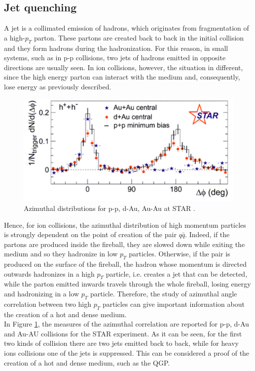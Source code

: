 \subsection{Jet quenching}
A jet is a collimated emission of hadrons, which originates from fragmentation of a high-$p_{T}$ parton. These partons are created back to back in the initial collision and they form hadrons during the hadronization. For this reason, in small systems, such as in p-p collisions, two jets of hadrons emitted in opposite directions are usually seen. In ion collisions, however, the situation in different, since the high energy parton can interact with the medium and, consequently, lose energy as previously described.
%
\begin{figure}
  \centering
  \includegraphics[scale=0.3]{figures/zoom.jpeg}
  \caption{Azimuthal distributions for p-p, d-Au, Au-Au at STAR \cite{jets}.}
  \label{fig:jet}
\end{figure}
%
Hence, for ion collisions, the azimuthal distribution of high momentum particles is strongly dependent on the point of creation of the pair $q\bar{q}$. Indeed, if the partons are produced inside the fireball, they are slowed down while exiting the medium and so they hadronize in low $p_{T}$ particles. Otherwise, if the pair is produced on the surface of the fireball, the hadron whose momentum is directed outwards hadronizes in a high $p_{T}$ particle, i.e. creates a jet that can be detected, while the parton emitted inwards travels through the whole fireball, losing energy and hadronizing in a low $p_{T}$ particle. Therefore, the study of azimuthal angle correlation between two high $p_{T}$ particles can give important information about the creation of a hot and dense medium.\\
In Figure \ref{fig:jet}, the measures of the azimuthal correlation are reported for p-p, d-Au and Au-AU collisions for the STAR experiment. As it can be seen, for the first two kinds of collision there are two jets emitted back to back, while for heavy ions collisions one of the jets is suppressed. This can be considered a proof of the creation of a hot and dense medium, such as the QGP.\\
